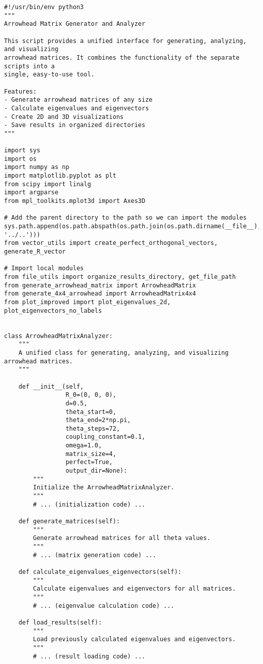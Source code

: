 \begin{verbatim}
#!/usr/bin/env python3
"""
Arrowhead Matrix Generator and Analyzer

This script provides a unified interface for generating, analyzing, and visualizing
arrowhead matrices. It combines the functionality of the separate scripts into a
single, easy-to-use tool.

Features:
- Generate arrowhead matrices of any size
- Calculate eigenvalues and eigenvectors
- Create 2D and 3D visualizations
- Save results in organized directories
"""

import sys
import os
import numpy as np
import matplotlib.pyplot as plt
from scipy import linalg
import argparse
from mpl_toolkits.mplot3d import Axes3D

# Add the parent directory to the path so we can import the modules
sys.path.append(os.path.abspath(os.path.join(os.path.dirname(__file__), '../..')))
from vector_utils import create_perfect_orthogonal_vectors, generate_R_vector

# Import local modules
from file_utils import organize_results_directory, get_file_path
from generate_arrowhead_matrix import ArrowheadMatrix
from generate_4x4_arrowhead import ArrowheadMatrix4x4
from plot_improved import plot_eigenvalues_2d, plot_eigenvectors_no_labels


class ArrowheadMatrixAnalyzer:
    """
    A unified class for generating, analyzing, and visualizing arrowhead matrices.
    """
    
    def __init__(self, 
                 R_0=(0, 0, 0), 
                 d=0.5, 
                 theta_start=0, 
                 theta_end=2*np.pi, 
                 theta_steps=72,
                 coupling_constant=0.1, 
                 omega=1.0, 
                 matrix_size=4, 
                 perfect=True,
                 output_dir=None):
        """
        Initialize the ArrowheadMatrixAnalyzer.
        """
        # ... (initialization code) ...
        
    def generate_matrices(self):
        """
        Generate arrowhead matrices for all theta values.
        """
        # ... (matrix generation code) ...
        
    def calculate_eigenvalues_eigenvectors(self):
        """
        Calculate eigenvalues and eigenvectors for all matrices.
        """
        # ... (eigenvalue calculation code) ...
        
    def load_results(self):
        """
        Load previously calculated eigenvalues and eigenvectors.
        """
        # ... (result loading code) ...
        

\end{verbatim}
